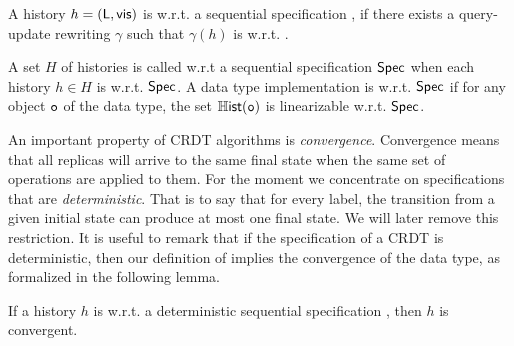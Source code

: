 \begin{definition}[\CRDTLin{}]
  \label{definition:distributed linearizability} A history $h =
  (\mathsf{L},\mathsf{vis})$ is \crdtlinearizable{} w.r.t. a
   sequential specification
  \Spec{}, if there exists a query-update rewriting $\gamma$ such that $\gamma(h)$ is \crdtlinearizable{} w.r.t. \Spec{}.
\end{definition}


A set $H$ of histories is called \crdtlinearizable{} w.r.t a
sequential specification $\mathsf{Spec}$ when each history $h\in H$ is
\crdtlinearizable{} w.r.t.
$\mathsf{Spec}$.
A data type implementation is \crdtlinearizable{} w.r.t.
$\mathsf{Spec}$ if for any object $\mathtt{o}$ of the data type, the set
$\mathbb{H}\mathsf{ist}(\mathtt{o})$ is linearizable w.r.t. $\mathsf{Spec}$.



An important property of CRDT algorithms is \emph{convergence}.
Convergence means that all replicas will arrive to the same final
state when the same set of operations are applied to them.
For the moment we concentrate on specifications that are
\emph{deterministic}.
That is to say that for every label, the transition from a given
initial state can produce at most one final state.
We will later remove this restriction.
It is useful to remark that if the specification of a CRDT is
deterministic, then our definition of \crdtlin{} implies the
convergence of the data type, as formalized in the following lemma.

\begin{lemma}
\label{lemma:distributed linarizability implies convergence}
If a history $h$ is \crdtlinearizable{} w.r.t. a deterministic
sequential specification \Spec, then $h$ is convergent.
\end{lemma}









